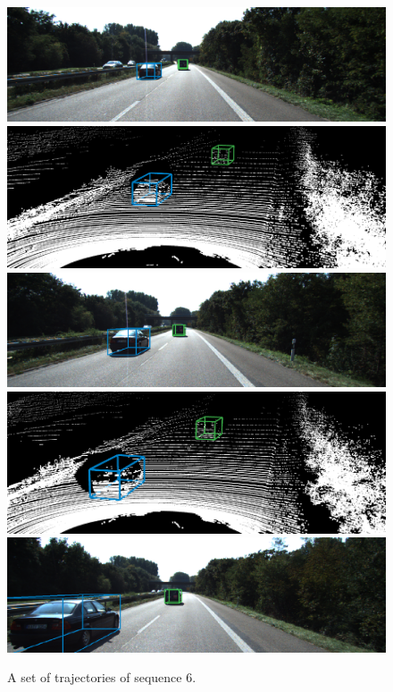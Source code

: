 \documentclass{bmvc2k}
\begin{document}
\begin{figure}
{\begin{minipage}[b]{0.5\linewidth}
	\includegraphics[width=1\linewidth]{images/supplementary/06/img/03.png}\vspace{3.55pt}
	\includegraphics[width=1\linewidth]{images/supplementary/06/pc/02.png}\vspace{1pt}
	\includegraphics[width=1\linewidth]{images/supplementary/06/img/02.png}\vspace{3.55pt}
	\includegraphics[width=1\linewidth]{images/supplementary/06/pc/01.png}\vspace{1pt}
	\includegraphics[width=1\linewidth]{images/supplementary/06/img/01.png}
	\end{minipage}}
	\caption{A set of trajectories of sequence 6.}
\end{figure}
\end{document}
